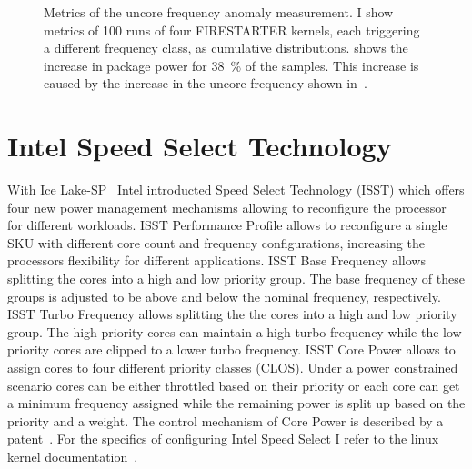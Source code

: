 \begin{figure}[t!]
    \caption{Metrics of the uncore frequency anomaly measurement.
    I show metrics of \SI{100}{} runs of four FIRESTARTER kernels, each triggering a different frequency class, as cumulative distributions.
     shows the increase in package power for \SI{38}{\percent} of the samples.
    This increase is caused by the increase in the uncore frequency shown in~.}
    \label{fig:avx-frequency-uncore-anomaly}
\end{figure}


\section{Intel Speed Select Technology}
\label{sec:isst}
With Ice Lake-SP~\cite{Intel_2020_IceLake_SP} Intel introducted Speed Select Technology (ISST) which offers four new power management mechanisms allowing to reconfigure the processor for different workloads.
ISST Performance Profile allows to reconfigure a single SKU with different core count and frequency configurations, increasing the processors flexibility for different applications.
ISST Base Frequency allows splitting the cores into a high and low priority group.
The base frequency of these groups is adjusted to be above and below the nominal frequency, respectively.
ISST Turbo Frequency allows splitting the the cores into a high and low priority group.
The high priority cores can maintain a high turbo frequency while the low priority cores are clipped to a lower turbo frequency.
ISST Core Power allows to assign cores to four different priority classes (CLOS).
Under a power constrained scenario cores can be either throttled based on their priority or each core can get a minimum frequency assigned while the remaining power is split up based on the priority and a weight.
The control mechanism of Core Power is described by a patent~\cite[pages~87-111]{Intel_2021_HPM}.
For the specifics of configuring Intel Speed Select I refer to the linux kernel documentation~\cite{Kernel_IntelSpeedSelect}.

